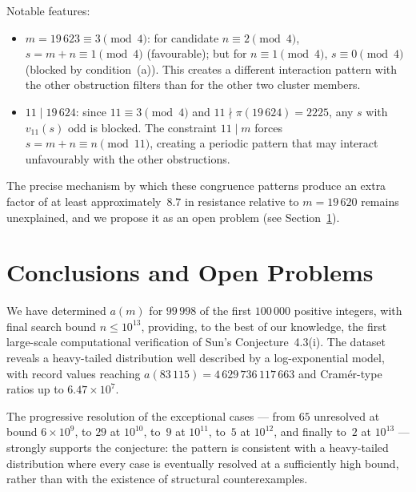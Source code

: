 \documentclass[11pt]{article}
\theoremstyle{definition}
\theoremstyle{remark}
\numberwithin{equation}{section}
\newcommand{\vq}[1]{v_{#1}}
\begin{document}
Notable features:
\begin{itemize}
\item $m = 19\,623 \equiv 3 \pmod{4}$: for candidate
  $n \equiv 2 \pmod{4}$, $s = m + n \equiv 1 \pmod{4}$
  (favourable); but for $n \equiv 1 \pmod{4}$,
  $s \equiv 0 \pmod{4}$ (blocked by condition~(a)).
  This creates a different interaction pattern with the other
  obstruction filters than for the other two cluster members.
\item $11 \mid 19\,624$: since $11 \equiv 3 \pmod{4}$ and
  $11 \nmid \pi(19\,624) = 2225$, any $s$ with $\vq{11}(s)$ odd
  is blocked.  The constraint $11 \mid m$ forces
  $s = m + n \equiv n \pmod{11}$, creating a periodic pattern
  that may interact unfavourably with the other obstructions.
\end{itemize}

The precise mechanism by which these congruence patterns produce an
extra factor of at least approximately~$8.7$ in resistance relative to $m = 19\,620$
remains unexplained, and we propose it as an open problem
(see Section~\ref{sec:conclusions}).

\section{Conclusions and Open Problems}
\label{sec:conclusions}

We have determined $a(m)$ for $99\,998$ of the first $100\,000$
positive integers, with final search bound $n \le 10^{13}$,
providing, to the best of our knowledge, the first large-scale
computational verification of Sun's Conjecture~4.3(i).
The dataset reveals a heavy-tailed distribution
well described by a log-exponential model, with record values
reaching $a(83\,115) = 4\,629\,736\,117\,663$ and
Cram\'er-type ratios up to $6.47 \times 10^7$.

The progressive resolution of the exceptional cases --- from $65$
unresolved at bound $6 \times 10^9$, to $29$ at $10^{10}$, to~$9$
at $10^{11}$, to~$5$ at $10^{12}$, and finally to~$2$ at
$10^{13}$ --- strongly supports the conjecture: the pattern is
consistent with a heavy-tailed distribution where
every case is eventually resolved at a sufficiently high bound,
rather than with the existence of structural counterexamples.
\end{document}
